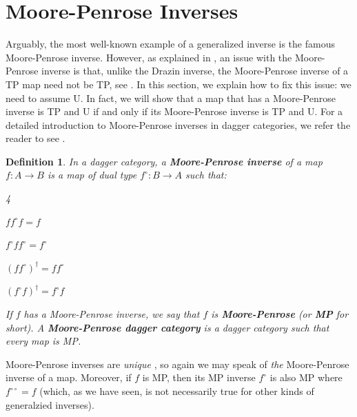 \documentclass[submission,copyright,creativecommons]{eptcs}
\newtheorem{definition}[observation]{Definition}
\begin{document}
\section{Moore-Penrose Inverses}

Arguably, the most well-known example of a generalized inverse is the famous Moore-Penrose inverse. However, as explained in \cite{cao2021nisq}, an issue with the Moore-Penrose inverse is that, unlike the Drazin inverse, the Moore-Penrose inverse of a TP map need not be TP, see \cite[Ex 2]{cao2021nisq}. In this section, we explain how to fix this issue: we need to assume U. In fact, we will show that a map that has a Moore-Penrose inverse is TP and U if and only if its Moore-Penrose inverse is TP and U. For a detailed introduction to Moore-Penrose inverses in dagger categories, we refer the reader to see \cite{Cockett2023Moore}.

\begin{definition} In a dagger category, a \textbf{Moore-Penrose inverse} \cite[Def 2.3]{Cockett2023Moore} of a map $f: A \to B$ is a map of dual type $f^\circ: B \to A$ such that:
\vspace{-0.3cm}
\begin{enumerate}[{\bf [$\text{MP}$.1]}]
\begin{multicols}{4}
    \item $f f^\circ f = f$
\columnbreak
    \item $f^\circ f f^\circ = f^\circ$
\columnbreak
\item $(ff^\circ)^\dagger = ff^\circ$
\columnbreak
    \item $(f^\circ f)^\dagger = f^\circ f$
\end{multicols}
\end{enumerate}
\vspace{-0.3cm}
If $f$ has a Moore-Penrose inverse, we say that $f$ is \textbf{Moore-Penrose} (or \textbf{MP} for short). A \textbf{Moore-Penrose dagger category} is a dagger category such that every map is MP. 
\end{definition}

Moore-Penrose inverses are \emph{unique} \cite[Lem 2.4]{Cockett2023Moore}, so again we may speak of \emph{the} Moore-Penrose inverse of a map. Moreover, if $f$ is MP, then its MP inverse $f^\circ$ is also MP where $f^{\circ\circ} = f$ \cite[Lem 2.5.(i)]{Cockett2023Moore} (which, as we have seen, is not necessarily true for other kinds of generalzied inverses). 

\end{document}
